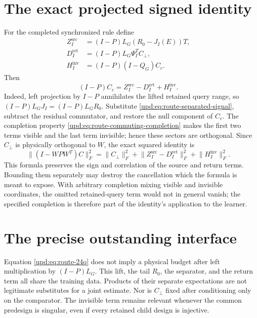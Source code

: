 \documentclass[11pt,oneside,openany,a4paper]{book}
\numberwithin{equation}{chapter}
\theoremstyle{definition}
\theoremstyle{remark}
\begin{document}
\section{The exact projected signed identity}

For the completed synchronized rule define
\begin{align*}
 Z_I^{\mathrm{src}}&=(I-P)L_G(R_0-J_I(E))T,\\
 D_I^{\mathrm{ret}}&=(I-P)L_G\Psi_I^TC_\perp,\\
 H_I^{\mathrm{inv}}&=(I-P)(I-Q_G)C_c.
\end{align*}
Then
\begin{equation}
 (I-P)C_c=Z_I^{\mathrm{src}}-D_I^{\mathrm{ret}}
                  +H_I^{\mathrm{inv}}.
 \label{upd:eq:route-signed}
\end{equation}
Indeed, left projection by $I-P$ annihilates the lifted retained query
range, so $(I-P)L_GJ_I=(I-P)L_GR_0$.  Substitute
\eqref{upd:eq:route-separated-signal}, subtract the residual commutator,
and restore the null component of $C_c$.  The completion property
\eqref{upd:eq:route-commuting-completion} makes the first two terms visible
and the last term invisible; hence these sectors are orthogonal.
Since $C_\perp$ is physically orthogonal to $W$, the exact squared
identity is
\begin{equation}
 \lVert(I-WPW^T)C\rVert_F^2
 =\lVert C_\perp\rVert_F^2
  +\lVert Z_I^{\mathrm{src}}-D_I^{\mathrm{ret}}\rVert_F^2
  +\lVert H_I^{\mathrm{inv}}\rVert_F^2.
 \label{upd:eq:route-signed-energy}
\end{equation}
This formula preserves the sign and correlation of the source and
return terms.  Bounding them separately may destroy the cancellation
which the formula is meant to expose.  With arbitrary completion
mixing visible and invisible coordinates, the omitted retained-query
term would not in general vanish; the specified completion is therefore
part of the identity's application to the learner.

\section{The precise outstanding interface}

Equation \eqref{upd:eq:route-24q} does not imply a physical budget after
left multiplication by $(I-P)L_G$.  This lift, the tail $R_0$, the
separator, and the return term all share the training data.  Products
of their separate expectations are not legitimate substitutes for a
joint estimate.  Nor is $C_\perp$ fixed after conditioning only on the
comparator.  The invisible term remains relevant whenever the common
predesign is singular, even if every retained child design is injective.
\end{document}
